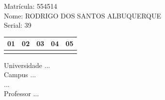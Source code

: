 \documentclass[10pt,a4paper,twocolumn]{report}
\begin{document}
Matrícula: 554514\\ Nome: RODRIGO DOS SANTOS ALBUQUERQUE \\ Serial: 39\\
\begin{tabular}{|l|l|l|l|l|}\hline
01  &02  &03  &04  &05 \\ \hline 
 & & & & \\ \hline 
\end{tabular}
 \cleardoublepage 

\begin{flushleft}
Universidade ...\\
Campus ...\\
...\\
Professor ...\\
\end{flushleft}
\end{document}
